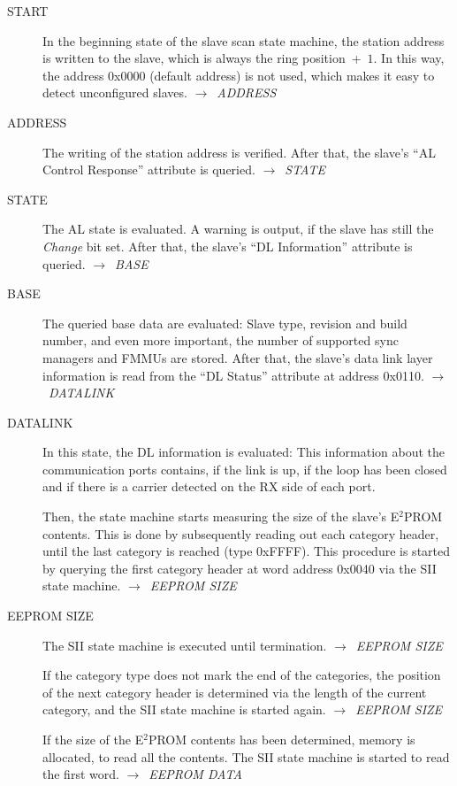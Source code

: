 \documentclass[a4paper,12pt,BCOR6mm,bibtotoc,idxtotoc]{scrbook}
\begin{document}
\begin{description}
\item[START] In the beginning state of the slave scan state machine,
  the station address is written to the slave, which is always the
  ring position~+~$1$. In this way, the address 0x0000 (default
  address) is not used, which makes it easy to detect unconfigured
  slaves.  $\rightarrow$~\textit{ADDRESS}

\item[ADDRESS] The writing of the station address is verified. After
  that, the slave's ``AL Control Response'' attribute is queried.
  $\rightarrow$~\textit{STATE}

\item[STATE] The AL state is evaluated. A warning is output, if the
  slave has still the \textit{Change} bit set. After that, the slave's
  ``DL Information'' attribute is queried.
  $\rightarrow$~\textit{BASE}

\item[BASE] The queried base data are evaluated: Slave type, revision
  and build number, and even more important, the number of supported
  sync managers and FMMUs are stored. After that, the slave's data
  link layer information is read from the ``DL Status'' attribute at
  address 0x0110. $\rightarrow$~\textit{DATALINK}

\item[DATALINK] In this state, the DL information is evaluated: This
  information about the communication ports contains, if the link is
  up, if the loop has been closed and if there is a carrier detected
  on the RX side of each port.

  Then, the state machine starts measuring the size of the slave's
  E$^2$PROM contents. This is done by subsequently reading out each
  category header, until the last category is reached (type 0xFFFF).
  This procedure is started by querying the first category header at
  word address 0x0040 via the SII state machine.
  $\rightarrow$~\textit{EEPROM SIZE}

\item[EEPROM SIZE] The SII state machine is executed until
  termination. $\rightarrow$~\textit{EEPROM SIZE}

  If the category type does not mark the end of the categories, the
  position of the next category header is determined via the length of
  the current category, and the SII state machine is started again.
  $\rightarrow$~\textit{EEPROM SIZE}

  If the size of the E$^2$PROM contents has been determined, memory is
  allocated, to read all the contents. The SII state machine is
  started to read the first word. $\rightarrow$~\textit{EEPROM DATA}


\end{description}
\end{document}
